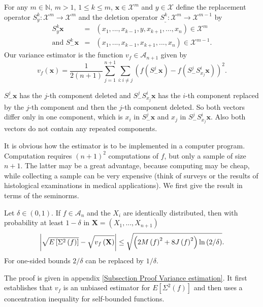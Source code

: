\documentclass[final,12pt]{colt2018} %
\begin{document}
		For any $m\in 
		\mathbb{N}
		$, $m>1$, $1\leq k\leq m$, $\mathbf{x}\in \mathcal{X}^{m}$ and $y\in 
		\mathcal{X}$ define the replacement operator $S_{y}^{k}:\mathcal{X}%
		^{m}\rightarrow \mathcal{X}^{m}$ and the deletion operator $S_{\_}^{k}:%
		\mathcal{X}^{m}\rightarrow \mathcal{X}^{m-1}$ by%
		\begin{eqnarray*}
			S_{y}^{k}\mathbf{x} &=&\left( x_{1},...,x_{k-1},y,x_{k+1},...,x_{n}\right)
			\in \mathcal{X}^{m} \\
			\text{and }S_{-}^{k}\mathbf{x} &=&\left(
			x_{1},...,x_{k-1},x_{k+1},...,x_{n}\right) \in \mathcal{X}^{m-1}.
		\end{eqnarray*}%
		Our variance estimator is the function $v_{f}\in \mathcal{A}_{n+1}$ given by%
		\begin{equation}
		v_{f}\left( \mathbf{x}\right) =\frac{1}{2\left( n+1\right) }%
		\sum_{j=1}^{n+1}\sum_{i:i\neq j}\left( f\left( S_{-}^{j}\mathbf{x}\right)
		-f\left( S_{-}^{j}S_{x_{j}}^{i}\mathbf{x}\right) \right) ^{2}.
		\label{Variance estimator}
		\end{equation}
		
		$S_{-}^{j}\mathbf{x}$ has the $j$-th component deleted and $%
		S_{-}^{j}S_{x_{j}}^{i}\mathbf{x}$ has the $i$-th component replaced by the $%
		j $-th component and then the $j$-th component deleted. So both vectors
		differ only in one component, which is $x_{i}$ in $S_{-}^{j}\mathbf{x}$ and $%
		x_{j}$ in $S_{-}^{j}S_{x_{j}}^{i}\mathbf{x}$. Also both vectors do not
		contain any repeated components.
		
		It is obvious how the estimator is to be implemented in a computer program.
		Computation requires $\left( n+1\right) ^{2}$ computations of $f$, but only
		a sample of size $n+1$. The latter may be a great advantage, because
		computing may be cheap, while collecting a sample can be very expensive
		(think of surveys or the results of histological examinations in medical
		applications). We first give the result in terms of the seminorms.
		
		\begin{theorem}
			\label{Theorem Variance Raw}Let $\delta \in (0,1)$. If $f\in \mathcal{A}_{n}$ and the $X_{i}$ are
			identically distributed, then with probability at least $%
			1-\delta $ in $\mathbf{X}=\left( X_{1},...,X_{n+1}\right) $%
			\begin{equation*}
			\left\vert \sqrt{E\left[ \Sigma ^{2}\left( f\right) \right] }-\sqrt{%
				v_{f}\left( \mathbf{X}\right) }\right\vert \leq \sqrt{\left( 2M\left(
				f\right) ^{2}+8J\left( f\right) ^{2}\right) \ln \left( 2/\delta \right) }. 
			\end{equation*}%
			For one-sided bounds $2/\delta $ can be replaced by $1/\delta $.
		\end{theorem}
		The proof is given in appendix \ref{Subsection
			Proof Variance estimation}. It first establishes that $v_{f}$ is an unbiased
		estimator for $E\left[ \Sigma ^{2}\left( f\right) \right] $ and then uses a
		concentration inequality for self-bounded functions.
		
\end{document}

